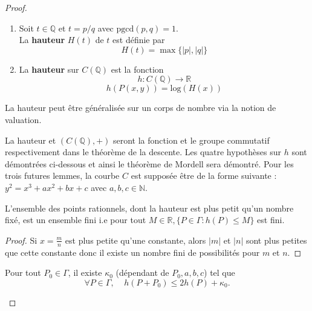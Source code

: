 \documentclass[a4paper]{article}
\begin{document}
\begin{proof}
\begin{definition}
\begin{enumerate}
\item
Soit $t \in \mathbb{Q}$ et $t=p/q$ avec $\text{pgcd}(p,q)=1$. \\
La \textbf{hauteur} $H(t)$ de $t$ est définie par 
\begin{equation*}
H(t)=\max\{| p |,| q |\}
\end{equation*}
\item
La \textbf{hauteur} sur $C(\mathbb{Q})$ est la fonction 
\begin{equation*}
h : C(\mathbb{Q}) \rightarrow \mathbb{R} 
\end{equation*}
\begin{equation*}
h(P(x,y))=\text{log}(H(x))
\end{equation*}
\end{enumerate}
\end{definition} 

\begin{rem}
La hauteur peut être généralisée sur un corps de nombre via la notion de valuation.
\end{rem}
\noindent La hauteur et $(C(\mathbb{Q}),+)$ seront la fonction et le groupe commutatif respectivement dans le théorème de la descente.
Les quatre hypothèses sur $h$ sont démontrées ci-dessous et ainsi le théorème de Mordell sera démontré.
Pour les trois futures lemmes, la courbe $C$ est supposée être de la forme suivante : $y^2=x^3+ax^2+bx+c$ avec $a,b,c \in \mathbb{N}$.
\begin{lem} \label{lem1}
L'ensemble des points rationnels, dont la hauteur est plus petit qu'un nombre fixé, est un ensemble fini i.e pour tout $M \in \mathbb{R}, \{P \in \Gamma : h(P) \leqslant M\}$ est fini.
\end{lem}

\begin{proof}
Si $x=\frac{m}{n}$ est plus petite qu'une constante, alors $| m |$ et $| n |$ sont plus petites que cette constante donc il existe un nombre fini de possibilités pour $m$ et $n$.
\end{proof}

\begin{lem} \label{lem2}
Pour tout $P_{0} \in \Gamma$, il existe $\kappa_{0}$ (dépendant de $P_{0},a,b,c$) tel que 
\begin{equation*}
\forall P \in \Gamma, \; \; \; \;  h(P+P_{0}) \leqslant 2h(P) + \kappa_{0}. 
\end{equation*}
\end{lem}



\end{proof}
\end{document}
